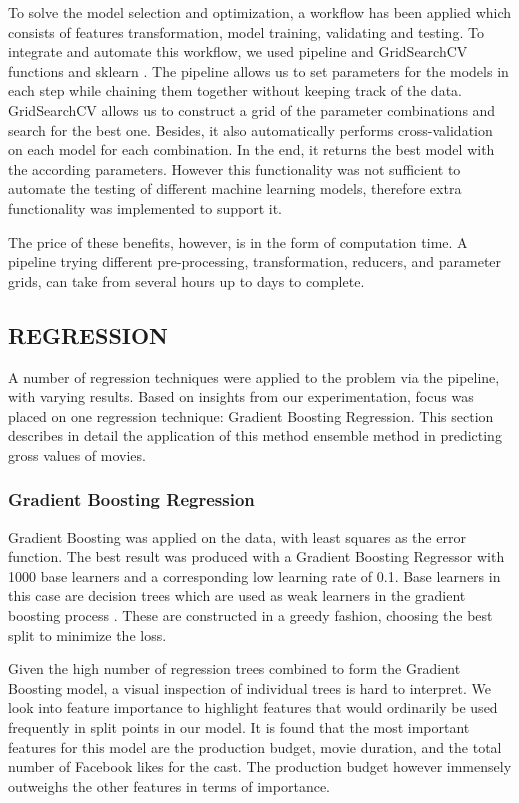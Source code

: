 To solve the model selection and optimization, a  workflow has been applied which consists of features transformation, model training, validating and testing. To integrate and automate this workflow, we used  pipeline and GridSearchCV functions and sklearn \cite{sklearnpipeline}. The pipeline allows us to set parameters for the models in each step while chaining them together without keeping track of the data. GridSearchCV allows us to construct a grid of the parameter combinations and search for the best one. Besides, it also automatically performs cross-validation on each model for each combination. In the end, it returns the best model with the according parameters. However this functionality was not sufficient to automate the testing of different machine learning models, therefore extra functionality was implemented to support it.

 The price of these benefits, however, is in the form of computation time. A pipeline trying different pre-processing, transformation, reducers, and parameter grids,  can take  from several hours up to days to complete. 

\subsection{REGRESSION}
A number of regression techniques were applied to the problem via the pipeline, with varying results. Based on insights from our experimentation, focus was placed on one regression technique: Gradient Boosting Regression. This section describes in detail the application of this method ensemble method in predicting gross values of movies. 

\subsubsection{Gradient Boosting Regression}
Gradient Boosting was applied on the data, with least squares as the error function. The best result was produced with a Gradient Boosting Regressor with 1000 base learners and a corresponding low learning rate of 0.1. Base learners in this case are decision trees which are used as weak learners in the gradient boosting process \cite{natekin2013gradient}. These are constructed in a greedy fashion, choosing the best split to minimize the loss. 

Given the high number of regression trees combined to form the Gradient Boosting model, a visual inspection of individual trees is hard to interpret. We look into feature importance to highlight features that would ordinarily be used frequently in split points in our model. It is found that the most important features for this model are the production budget, movie duration, and the total number of Facebook likes for the cast. The production budget however immensely outweighs the other features in terms of importance. 

